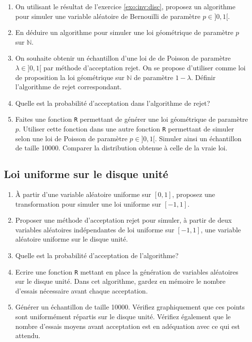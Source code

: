 \documentclass[]{article}
\begin{document}
\begin{enumerate}
\def\labelenumi{\arabic{enumi}.}
\item
  On utilisant le résultat de l'exercice \ref{exo:inv:disc}, proposez un
  algorithme pour simuler une variable aléatoire de Bernouilli de
  paramètre \(p \in ]0, 1[\).
\item
  En déduire un algorithme pour simuler une loi géométrique de paramètre
  \(p\) sur \(\mathbb{N}\).
\item
  On souhaite obtenir un échantillon d'une loi de de Poisson de
  paramètre \(\lambda \in ]0, 1[\) par méthode d'acceptation rejet. On
  se propose d'utiliser comme loi de proposition la loi géométrique sur
  \(\mathbb{N}\) de paramètre \(1 - \lambda\). Définir l'algorithme de
  rejet correspondant.
\item
  Quelle est la probabilité d'acceptation dans l'algorithme de rejet?
\item
  Faites une fonction \texttt{R} permettant de générer une loi
  géométrique de paramètre \(p\). Utiliser cette fonction dans une autre
  fonction \texttt{R} permettant de simuler selon une loi de Poisson de
  paramètre \(p \in ]0, 1[\). Simuler ainsi un échantillon de taille
  10000. Comparer la distribution obtenue à celle de la vraie loi.
\end{enumerate}

\hypertarget{loi-uniforme-sur-le-disque-unituxe9}{%
\subsection{Loi uniforme sur le disque
unité}\label{loi-uniforme-sur-le-disque-unituxe9}}

\begin{enumerate}
\def\labelenumi{\arabic{enumi}.}
\item
  À partir d'une variable aléatoire uniforme sur \([0, 1]\), proposez
  une transformation pour simuler une loi uniforme sur \([-1, 1]\).
\item
  Proposer une méthode d'acceptation rejet pour simuler, à partir de
  deux variables aléatoires indépendantes de loi uniforme sur
  \([-1, 1]\), une variable aléatoire uniforme sur le disque unité.
\item
  Quelle est la probabilité d'acceptation de l'algorithme?
\item
  Ecrire une fonction \texttt{R} mettant en place la génération de
  variables aléatoires sur le disque unité. Dans cet algorithme, gardez
  en mémoire le nombre d'essais nécessaire avant chaque acceptation.
\item
  Générer un échantillon de taille 10000. Vérifiez graphiquement que ces
  points sont uniformément répartis sur le disque unité. Vérifiez
  également que le nombre d'essais moyens avant acceptation est en
  adéquation avec ce qui est attendu.
\end{enumerate}
\end{document}
